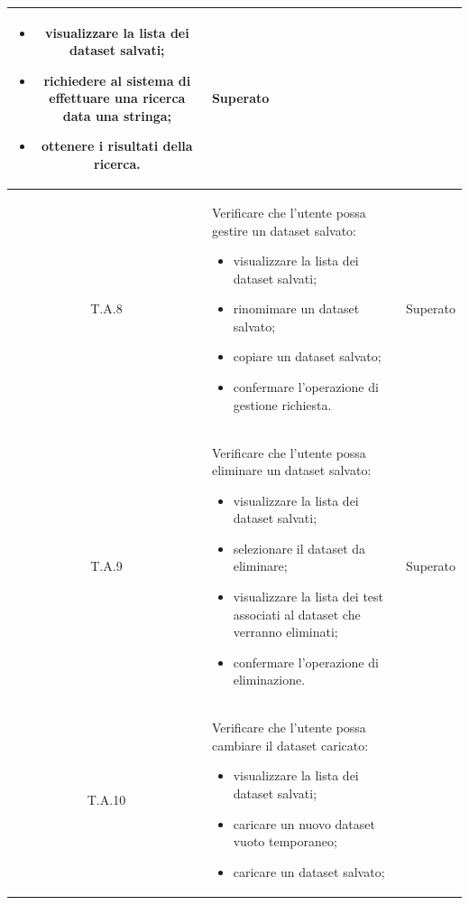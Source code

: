 \begin{tabularx}{\textwidth}{|c|X|c|}
                        \begin{itemize}
                            \item visualizzare la lista dei dataset salvati;
                            \item richiedere al sistema di effettuare una ricerca data una stringa;
                            \item ottenere i risultati della ricerca.
                        \end{itemize} & Superato\\ %
    \hline
    \label{ta:ta8}T.A.8 & Verificare che l'utente possa gestire un dataset salvato:
                        \begin{itemize}
                            \item visualizzare la lista dei dataset salvati;
                            \item rinomimare un dataset salvato;
                            \item copiare un dataset salvato;
                            \item confermare l'operazione di gestione richiesta.
                        \end{itemize} & Superato\\ %
    \hline
    \label{ta:ta9}T.A.9 & Verificare che l'utente possa eliminare un dataset salvato:
                        \begin{itemize}
                            \item visualizzare la lista dei dataset salvati;
                            \item selezionare il dataset da eliminare;
                            \item visualizzare la lista dei test associati al dataset che verranno eliminati;
                            \item confermare l'operazione di eliminazione.
                        \end{itemize} & Superato\\ %
    \hline
    \label{ta:ta10}T.A.10 & Verificare che l'utente possa cambiare il dataset caricato:
                        \begin{itemize}
                            \item visualizzare la lista dei dataset salvati;
                            \item caricare un nuovo dataset vuoto temporaneo;
                            \item caricare un dataset salvato;

\end{itemize}
\end{tabularx}
